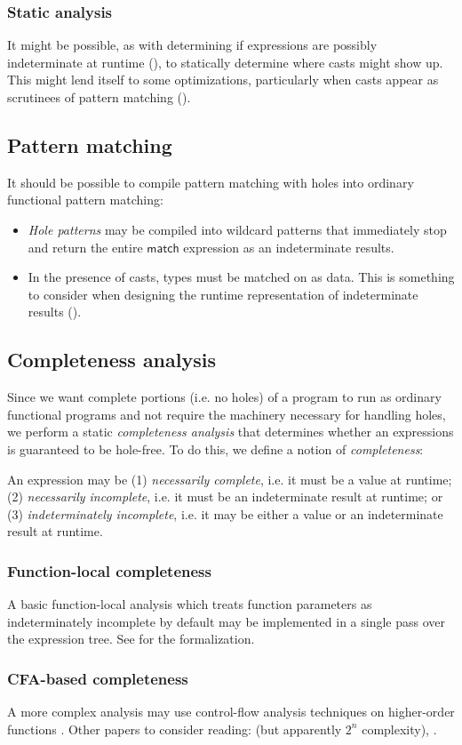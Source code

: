 \documentclass[index.tex]{subfiles}
\begin{document}
\subsubsection{Static analysis}
It might be possible, as with determining if expressions are possibly indeterminate at runtime
(), to statically determine where casts might show up. This might
lend itself to some optimizations, particularly when casts appear as scrutinees of pattern matching
().

\subsection{Pattern matching}
\label{sec:pattern-matching}
It should be possible to compile pattern matching with holes into ordinary functional pattern
matching:
\begin{itemize}
  \item \emph{Hole patterns} may be compiled into wildcard patterns that immediately stop and return
    the entire $\textsf{match}$ expression as an indeterminate results.
  \item In the presence of casts, types must be matched on as data. This is something to consider
    when designing the runtime representation of indeterminate results
    ().
\end{itemize}

\subsection{Completeness analysis}
\label{sec:completeness-analysis}
Since we want complete portions (i.e. no holes) of a program to run as ordinary functional programs
and not require the machinery necessary for handling holes, we perform a static \emph{completeness
analysis} that determines whether an expressions is guaranteed to be hole-free. To do this, we
define a notion of \emph{completeness}:
%
\begin{definition}[name=Completeness, label=completeness]
  An expression may be (1) \emph{necessarily complete}, i.e. it must be a value at runtime; (2)
  \emph{necessarily incomplete}, i.e. it must be an indeterminate result at runtime; or (3)
  \emph{indeterminately incomplete}, i.e. it may be either a value or an indeterminate result at
  runtime.
\end{definition}

\subsubsection{Function-local completeness}
A basic function-local analysis which treats function parameters as indeterminately
incomplete by default may be implemented in a single pass over the expression tree. See
 for the formalization.

\subsubsection{CFA-based completeness}
A more complex analysis may use control-flow analysis techniques on higher-order functions
\cite{shivers1991, nielson1999}. Other papers to consider reading: \textcite{vardoulaskis2011} (but
apparently $2^{n}$ complexity), \textcite{gilray2016}.
\end{document}
